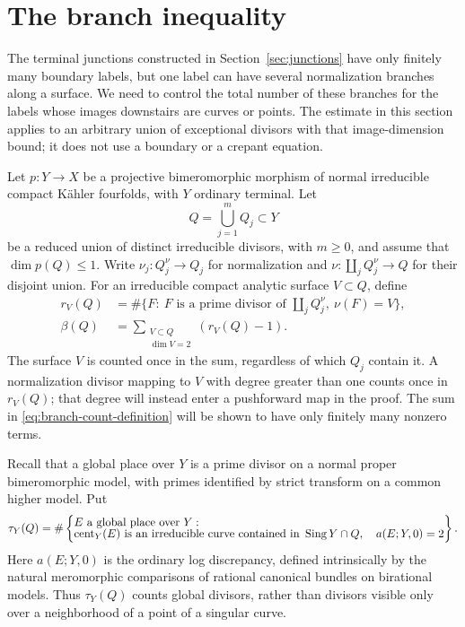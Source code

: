 \section{The branch inequality}
\label{sec:branch}

The terminal junctions constructed in Section~\ref{sec:junctions} have
only finitely many boundary labels, but one label can have several
normalization branches along a surface.  We need to control the total
number of these branches for the labels whose images downstairs are
curves or points.  The estimate in this section applies to an arbitrary
union of exceptional divisors with that image-dimension bound; it does
not use a boundary or a crepant equation.

Let $p\colon Y\to X$ be a projective bimeromorphic morphism of normal
irreducible compact K\"ahler fourfolds, with $Y$ ordinary terminal.  Let
\[
 Q=\bigcup_{j=1}^{m}Q_j\subset Y
\]
be a reduced union of distinct irreducible divisors, with $m\geq0$, and assume that
$\dim p(Q)\leq1$.  Write $\nu_j\colon Q_j^\nu\to Q_j$ for normalization
and $\nu\colon\coprod_jQ_j^\nu\to Q$ for their disjoint union.  For an
irreducible compact analytic surface $V\subset Q$, define
\begin{equation}\label{eq:branch-count-definition}
 \begin{aligned}
 r_V(Q)&=\#\{F:\ F\text{ is a prime divisor of }\coprod_jQ_j^\nu,
                         \ \nu(F)=V\},\\
 \beta(Q)&=\sum_{\substack{V\subset Q\\ \dim V=2}}(r_V(Q)-1).
 \end{aligned}
\end{equation}
The surface $V$ is counted once in the sum, regardless of which $Q_j$
contain it.  A normalization divisor mapping to $V$ with degree greater
than one counts once in $r_V(Q)$; that degree will instead enter a
pushforward map in the proof.  The sum in
\eqref{eq:branch-count-definition} will be shown to have only finitely
many nonzero terms.

Recall that a global place over $Y$ is a prime divisor on a normal proper
bimeromorphic model, with primes identified by strict transform on a
common higher model.  Put
\begin{equation}\label{eq:branch-place-count}
 \tau_Y(Q)=\#\left\{
 \begin{array}{@{}l@{}}
 E\text{ a global place over }Y:\\[-2pt]
 \cent_Y(E)\text{ is an irreducible curve contained in }\Sing Y\cap Q,
 \quad a(E;Y,0)=2
 \end{array}\right\}.
\end{equation}
Here $a(E;Y,0)$ is the ordinary log discrepancy, defined intrinsically
by the natural meromorphic comparisons of rational canonical bundles
on birational models.  Thus
$\tau_Y(Q)$ counts global divisors, rather than divisors visible only
over a neighborhood of a point of a singular curve.

